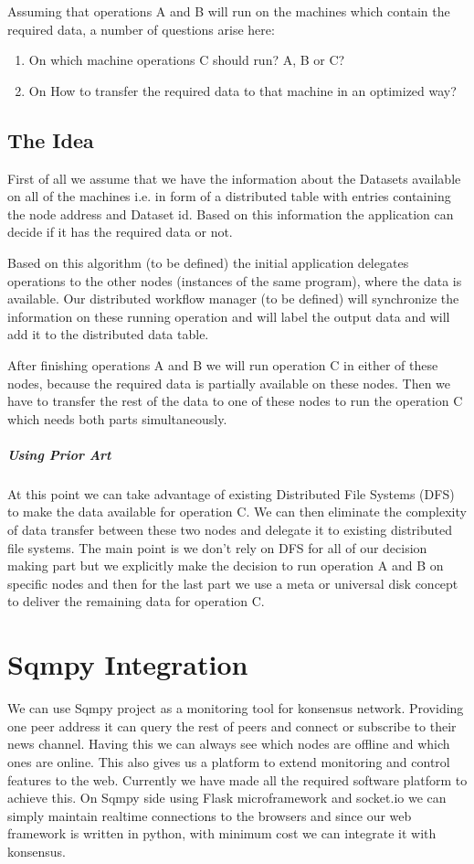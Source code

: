 Assuming that operations A and B will run on the machines which
contain the required data, a number of questions arise here:
\begin{enumerate}
\item On which machine operations C should run? A, B or C?
\item On How to transfer the required data to that machine in an 
optimized way?
\end{enumerate}

\subsection{The Idea}
First of all we assume that we have the information about the Datasets
available on all of the machines i.e. in form of a distributed table
with entries containing the node address and Dataset id. Based on this
information the application can decide if it has the required data or
not. 

Based on this algorithm (to be defined) the initial application
delegates operations to the other nodes (instances of the same program),
where the data is available. Our distributed workflow manager (to be 
defined) will synchronize the information on these running operation and
will label the output data and will add it to the distributed data table.

After finishing operations A and B we will run operation C in either
of these nodes, because the required data is partially available on these
nodes. Then we have to transfer the rest of the data to one of these
nodes to run the operation C which needs both parts simultaneously.

\subparagraph{Using Prior Art}
At this point we can take advantage of existing Distributed File Systems
(DFS) to make the data available for operation C. We can then eliminate
the complexity of data transfer between these two nodes and delegate it
to existing distributed file systems. The main point is we don't rely on
DFS for all of our decision making part but we explicitly make the 
decision to run operation A and B on specific nodes and then for the 
last part we use a meta or universal disk concept to deliver the
remaining data for operation C.

\section{Sqmpy Integration}
We can use Sqmpy project as a monitoring tool for konsensus network.
 Providing one peer address it can query the rest of peers and connect or 
subscribe to their news channel. Having this we can always see which nodes are
offline and which ones are online. This also gives us a platform to extend
monitoring and control features to the web. Currently we have made all the 
required software platform to achieve this. On Sqmpy side using Flask microframework
and socket.io we can simply maintain realtime connections to the browsers and since
our web framework is written in python, with minimum cost we can integrate it
with konsensus.
